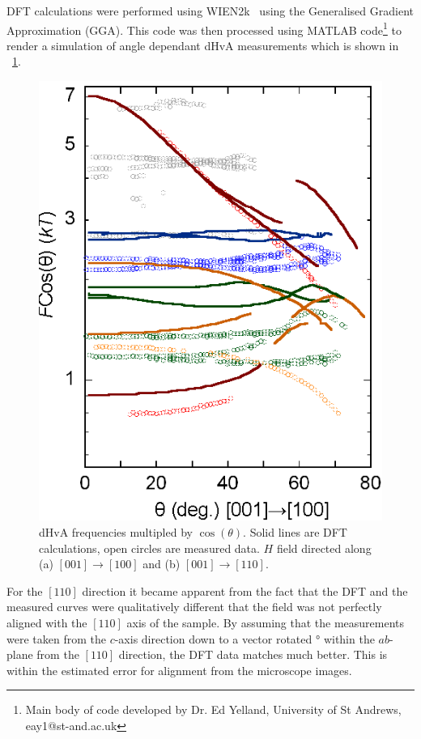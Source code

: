 DFT calculations were performed using WIEN2k~\cite{Blaha2001} using the Generalised Gradient Approximation (GGA). This code was then processed using MATLAB code\footnote{Main body of code developed by Dr. Ed Yelland, University of St Andrews, eay1@st-and.ac.uk} to render a simulation of angle dependant dHvA measurements which is shown in \fig~\ref{Fig:3:ComparisonRotationPlotUnshiftedDFT}. 
\begin{figure}[h!]
    \begin{center}
        \includegraphics[scale=0.7]{Chapter3-dHvABaFe2P2/Figures/AngleDepMeasurements/AngleSweepMeasuredUnshifted/AngleSweepMeasuredUnshifted}
        \caption{dHvA frequencies multipled by $\cos(\theta)$. Solid lines are DFT calculations, open circles are measured data. $H$ field directed along (a) $[001]\rightarrow[100]$ and (b) $[001]\rightarrow[110]$.}
        \label{Fig:3:ComparisonRotationPlotUnshiftedDFT}
    \end{center}
\end{figure}

For the $[110]$ direction it became apparent from the fact that the DFT and the measured curves were qualitatively different that the field was not perfectly aligned with the $[110]$ axis of the sample. By assuming that the measurements were taken from the $c$-axis direction down to a vector rotated \unit[10]{\degree} within the $ab$-plane from the $[110]$ direction, the DFT data matches much better. This is within the estimated error for alignment from the microscope images.



